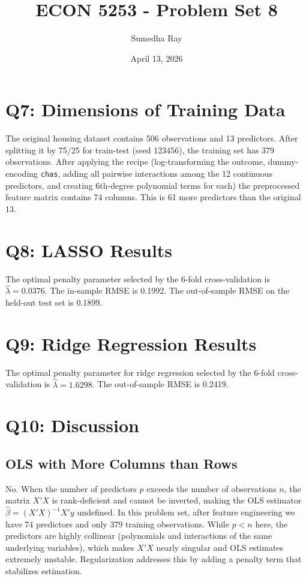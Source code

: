 \documentclass{article}
\title{ECON 5253 - Problem Set 8}
\author{Sumedha Ray}
\date{April 13, 2026}
\begin{document}
\maketitle

\section*{Q7: Dimensions of Training Data}

The original housing dataset contains 506 observations and 13 predictors. After splitting it by 75/25 for train-test (seed 123456), the training set has 379 observations. After applying the recipe (log-transforming the outcome, dummy-encoding \texttt{chas}, adding all pairwise interactions among the 12 continuous predictors, and creating 6th-degree polynomial terms for each) the preprocessed feature matrix contains 74 columns. This is 61 more predictors than the original 13.

\section*{Q8: LASSO Results}

The optimal penalty parameter selected by the 6-fold cross-validation is $\hat{\lambda} = 0.0376$. The in-sample RMSE is 0.1992. The out-of-sample RMSE on the held-out test set is 0.1899.

\section*{Q9: Ridge Regression Results}

The optimal penalty parameter for ridge regression selected by the 6-fold cross-validation is $\hat{\lambda} = 1.6298$. The out-of-sample RMSE is 0.2419.

\section*{Q10: Discussion}

\subsection*{OLS with More Columns than Rows}

No. When the number of predictors $p$ exceeds the number of observations $n$, the matrix $X'X$ is rank-deficient and cannot be inverted, making the OLS estimator $\hat{\beta} = (X'X)^{-1}X'y$ undefined. In this problem set, after feature engineering we have 74 predictors and only 379 training observations. While $p < n$ here, the predictors are highly collinear (polynomials and interactions of the same underlying variables), which makes $X'X$ nearly singular and OLS estimates extremely unstable. Regularization addresses this by adding a penalty term that stabilizes estimation.
\end{document}
